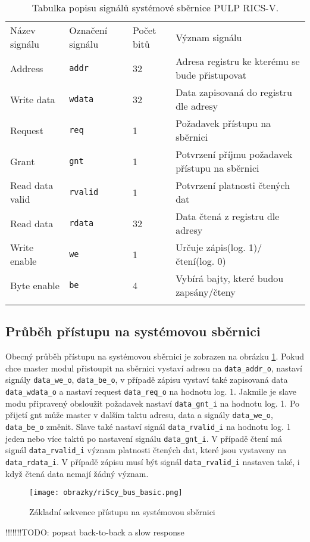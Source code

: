 \begin{table}[H]
	\FloatBarrier
  \caption{Tabulka popisu signálů systémové sběrnice PULP RICS-V. \cite{ri5cy}}
  \begin{center}
  	\small
	  \begin{tabular}{!{\vrule width 1.2pt}M{2.2cm}|M{1.5cm}|M{1.8cm}|M{7cm}!{\vrule width 1.2pt}}
	    Název signálu & Označení signálu & Počet bitů & Význam signálu\\
	    Address & \texttt{addr} & 32 & Adresa registru ke kterému se bude přistupovat\\
			\hline
			Write data & \texttt{wdata} & 32 & Data zapisovaná do registru dle adresy\\
			\hline
			Request & \texttt{req} & 1 & Požadavek přístupu na sběrnici\\
			\hline
			Grant & \texttt{gnt} & 1 & Potvrzení příjmu požadavek přístupu na sběrnici\\
			\hline			
			Read data valid & \texttt{rvalid} & 1 & Potvrzení platnosti čtených dat\\
			\hline
			Read data & \texttt{rdata} & 32 & Data čtená z registru dle adresy\\
			\hline
			Write enable & \texttt{we} & 1 & Určuje zápis(log. 1)/čtení(log. 0)\\
			\hline
			Byte enable & \texttt{be} & 4 & Vybírá bajty, které budou zapsány/čteny\\
			\hline
		\end{tabular}
  \end{center}
	\label{tab:ri5cy_bus}
\end{table}

\subsection{Průběh přístupu na systémovou sběrnici}
Obecný průběh přístupu na systémovou sběrnici je zobrazen na obrázku \ref{fig:ri5cy_bus_basic}. Pokud chce master modul přistoupit na sběrnici vystaví adresu na \texttt{data\_addr\_o}, nastaví signály \texttt{data\_we\_o}, \texttt{data\_be\_o}, v případě zápisu vystaví také zapisovaná data \texttt{data\_wdata\_o} a nastaví request \texttt{data\_req\_o} na hodnotu log. 1. Jakmile je slave modu připravený obsloužit požadavek nastaví \texttt{data\_gnt\_i} na hodnotu log. 1. Po přijetí gnt může master v dalším taktu adresu, data a signály \texttt{data\_we\_o}, \texttt{data\_be\_o} změnit. Slave také nastaví signál \texttt{data\_rvalid\_i} na hodnotu log. 1 jeden nebo více taktů po nastavení signálu \texttt{data\_gnt\_i}. V případě čtení má signál \texttt{data\_rvalid\_i} význam platnosti čtených dat, které jsou vystaveny na \texttt{data\_rdata\_i}. V případě zápisu musí být signál \texttt{data\_rvalid\_i} nastaven také, i když čtená data nemají žádný význam. \cite{ri5cy}

\begin{figure}[!h]
  \begin{center}
    \texttt{[image: obrazky/ri5cy\_bus\_basic.png]}
  \end{center}
  \caption{Základní sekvence přístupu na systémovou sběrnici \cite{ri5cy}}
	\label{fig:ri5cy_bus_basic}
\end{figure}

!!!!!!!TODO: popsat back-to-back a slow response